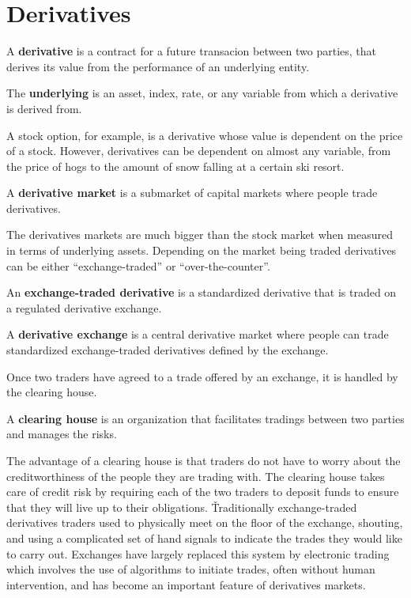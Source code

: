 \section{Derivatives}

\bd[Derivative]
A \textbf{derivative} is a contract for a future transacion between two parties, that derives its value from the
performance of an underlying entity.
\ed

\bd[Underlying]
The \textbf{underlying} is an asset, index, rate, or any variable from which a derivative is derived from.
\ed

\be
A stock option, for example, is a derivative whose value is dependent on the price of a stock. However, derivatives
can be dependent on almost any variable, from the price of hogs to the amount of snow falling at a certain ski resort.
\ee

A \textbf{derivative market} is a submarket of capital markets where people trade derivatives.
\ed

The derivatives markets are much bigger than the stock market when measured in terms of underlying assets. Depending
on the market being traded derivatives can be either ``exchange-traded'' or ``over-the-counter''.

An \textbf{exchange-traded derivative} is a standardized derivative that is traded on a regulated derivative exchange.
\ed

A \textbf{derivative exchange} is a central derivative market where people can trade standardized exchange-traded
derivatives defined by the exchange.
\ed

Once two traders have agreed to a trade offered by an exchange, it is handled by the clearing house.

A \textbf{clearing house} is an organization that facilitates tradings between two parties and manages the risks.
\ed

The advantage of a clearing house is that traders do not have to worry about the creditworthiness of the people they
are trading with. The clearing house takes care of credit risk by requiring each of the two traders to deposit funds
to ensure that they will live up to their obligations. \v

Traditionally exchange-traded derivatives traders used to physically meet on the floor of the exchange, shouting, and
using a complicated set of hand signals to indicate the trades they would like to carry out. Exchanges have largely
replaced this system by electronic trading which involves the use of algorithms to initiate trades, often without human
intervention, and has become an important feature of derivatives markets.

